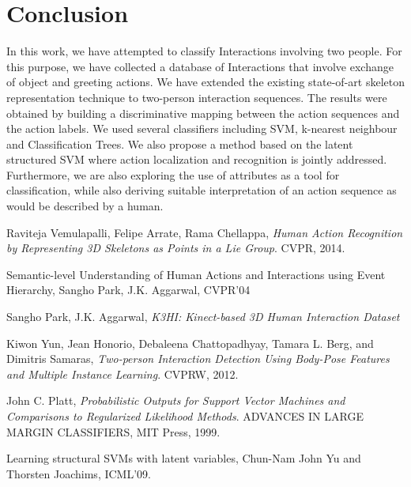 \documentclass[10pt,twocolumn,letterpaper]{article}
\begin{document}
\section{Conclusion}
In this work, we have attempted to classify Interactions involving two people. For this purpose, we have collected a database of Interactions that involve exchange of object and greeting actions. We have extended the existing state-of-art skeleton representation technique to two-person interaction sequences. The results were obtained by building a discriminative mapping between the action sequences and the action labels. We used several classifiers including SVM, k-nearest neighbour and Classification Trees. We also propose a method based on the latent structured SVM where action localization and recognition is jointly addressed. Furthermore, we are also exploring the use of attributes as a tool for classification, while also deriving suitable interpretation of an action sequence as would be described by a human. 

\begin{thebibliography}{9}

  Raviteja  Vemulapalli,
  Felipe Arrate,
  Rama Chellappa,
  \emph{Human Action Recognition by Representing 3D Skeletons as Points in a Lie Group}.
  CVPR,
  2014.

 Semantic-level Understanding of Human Actions and Interactions using Event Hierarchy, Sangho Park, J.K. Aggarwal, CVPR'04

	Sangho Park,
	J.K. Aggarwal,
	\emph{K3HI: Kinect-based 3D Human Interaction Dataset}

	Kiwon Yun, Jean Honorio, Debaleena Chattopadhyay, Tamara L. Berg, and Dimitris Samaras,
	\emph{Two-person Interaction Detection Using Body-Pose Features and Multiple Instance Learning}.
	CVPRW,
	2012.
	
	John C. Platt,
	\emph{Probabilistic Outputs for Support Vector Machines and Comparisons to Regularized Likelihood Methods}.
	ADVANCES IN LARGE MARGIN CLASSIFIERS, MIT Press, 1999.
	 
	

 Learning structural SVMs with latent variables, Chun-Nam John Yu and Thorsten Joachims, ICML'09.



\end{thebibliography}
\end{document}
